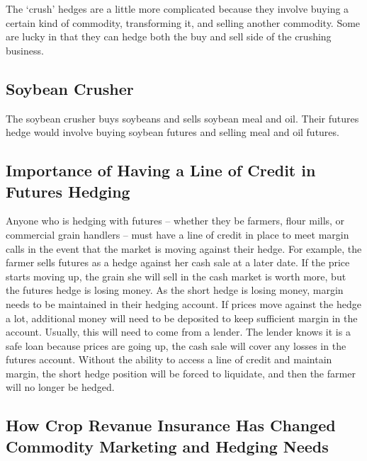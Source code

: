 \documentclass[
  letterpaper,
  DIV=11,
  numbers=noendperiod]{scrreprt}
\begin{document}
The `crush' hedges are a little more complicated because they involve
buying a certain kind of commodity, transforming it, and selling another
commodity. Some are lucky in that they can hedge both the buy and sell
side of the crushing business.

\hypertarget{soybean-crusher}{%
\subsection{Soybean Crusher}\label{soybean-crusher}}

The soybean crusher buys soybeans and sells soybean meal and oil. Their
futures hedge would involve buying soybean futures and selling meal and
oil futures.

\hypertarget{importance-of-having-a-line-of-credit-in-futures-hedging}{%
\subsection{Importance of Having a Line of Credit in Futures
Hedging}\label{importance-of-having-a-line-of-credit-in-futures-hedging}}

Anyone who is hedging with futures -- whether they be farmers, flour
mills, or commercial grain handlers -- must have a line of credit in
place to meet margin calls in the event that the market is moving
against their hedge. For example, the farmer sells futures as a hedge
against her cash sale at a later date. If the price starts moving up,
the grain she will sell in the cash market is worth more, but the
futures hedge is losing money. As the short hedge is losing money,
margin needs to be maintained in their hedging account. If prices move
against the hedge a lot, additional money will need to be deposited to
keep sufficient margin in the account. Usually, this will need to come
from a lender. The lender knows it is a safe loan because prices are
going up, the cash sale will cover any losses in the futures account.
Without the ability to access a line of credit and maintain margin, the
short hedge position will be forced to liquidate, and then the farmer
will no longer be hedged.

\hypertarget{how-crop-revanue-insurance-has-changed-commodity-marketing-and-hedging-needs}{%
\subsection{How Crop Revanue Insurance Has Changed Commodity Marketing
and Hedging
Needs}\label{how-crop-revanue-insurance-has-changed-commodity-marketing-and-hedging-needs}}
\end{document}
